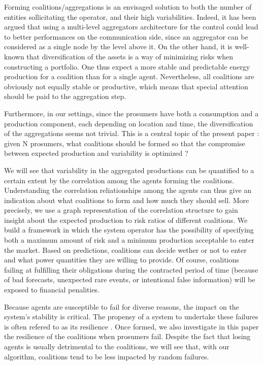 \documentclass[conference]{IEEEtran}
\begin{document}
Forming coalitions/aggregations is an envisaged solution to both the number of entities sollicitating the operator, and their high variabilities. Indeed, it has been argued that using a multi-level aggregators architecture for the control could lead to better performances on the communication side, since an aggregator can be considered as a single node by the level above it. On the other hand, it is well-known that diversification of the assets is a way of minimizing risks when constructing a portfolio. One thus expect a more stable and predictable energy production for a coalition than for a single agent. Nevertheless, all coalitions are obviously not equally stable or productive, which means that special attention should be paid to the aggregation step.

Furthermore, in our settings, since the prosumers have both a consumption and a production component, each depending on location and time, the diversification of the aggregations seems not trivial. This is a central topic of the present paper : given N prosumers, what coalitions should be formed so that the compromise between expected production and variability is optimized ?

We will see that variability in the aggregated productions can be quantified to a certain extent by the correlation among the agents forming the coalitions. Understanding the correlation reliationships among the agents can thus give an indication about what coalitions to form and how much they should sell. More precisely, we use a graph representation of the correlation structure to gain insight about the expected production to risk ratios of different coalitions. We build a framework in which the system operator has the possibility of specifying both a maximum amount of risk and a minimum production acceptable to enter the market. Based on predictions, coalitions can decide wether or not to enter and what power quantities they are willing to provide. Of course, coalitions failing at fulfilling their obligations during the contracted period of time (because of bad forecasts, unexpected rare events, or intentional false information) will be exposed to financial penalities.

Because agents are susceptible to fail for diverse reasons, the impact on the system's stability is critical. The propensy of a system to undertake these failures is often refered to as its resilience \cite{Pahwa}. Once formed, we also investigate in this paper the resilience of the coalitions when prosumers fail. Despite the fact that losing agents is usually detrimental to the coalitions, we will see that, with our algorithm, coalitions tend to be less impacted by random failures.
\end{document}

